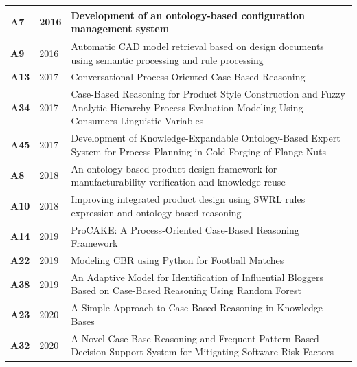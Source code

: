 {\begin{longtable}{ | m{1cm} | m{1.5cm} | m{12cm} | }
                    \hline
                    \textbf{A7} &2016 &Development of an ontology-based configuration management system \cite{na2016development}\\
                    \hline
                    \textbf{A9} &2016 &Automatic CAD model retrieval based on design documents using semantic processing and rule processing \cite{jeon2016automatic}\\
                    \hline
                    \textbf{A13} &2017 &Conversational Process-Oriented Case-Based Reasoning \cite{zeyen2017conversational}\\
                    \hline
                    \textbf{A34} &2017 &Case-Based Reasoning for Product Style Construction and Fuzzy Analytic Hierarchy Process Evaluation Modeling Using Consumers Linguistic Variables \cite{wang2017case}\\
                    \hline
                    \textbf{A45} &2017 &Development of Knowledge-Expandable Ontology-Based Expert System for Process Planning in Cold Forging of Flange Nuts \cite{chang2017development}\\
                    \hline
                    \textbf{A8} &2018 &An ontology-based product design framework for manufacturability verification and knowledge reuse \cite{li2018ontology}\\
                    \hline
                    \textbf{A10} &2018 &Improving integrated product design using SWRL rules expression and ontology-based reasoning \cite{abadi2018improving}\\
                    \hline
                    \textbf{A14} &2019 &ProCAKE: A Process-Oriented Case-Based Reasoning Framework \cite{bergmann2019procake}\\
                    \hline
                    \textbf{A22} &2019 &Modeling CBR using Python for Football Matches \cite{sawalkar2019modeling} \\
                    \hline
                    \textbf{A38} &2019 &An Adaptive Model for Identification of Influential Bloggers Based on Case-Based Reasoning Using Random Forest \cite{asim2019adaptive} \\
                    \hline
                    \textbf{A23} &2020 &A Simple Approach to Case-Based Reasoning in Knowledge Bases \cite{das2020simple} \\
                    \hline
                    \textbf{A32} &2020 &A Novel Case Base Reasoning and Frequent Pattern Based Decision Support System for Mitigating Software Risk Factors \cite{asif2020novel} \\

\end{longtable}}
